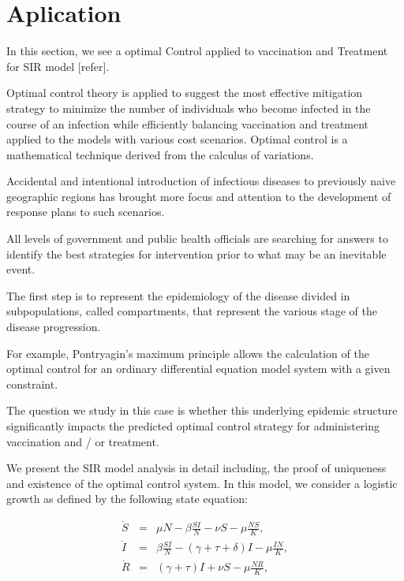 \section{Aplication}

In this section, we see a optimal Control applied to vaccination and Treatment for SIR model [refer].

Optimal control theory is applied to suggest the most effective mitigation strategy to minimize the number of individuals who become infected in the course of an infection while efficiently balancing vaccination and treatment applied to the models with various cost scenarios. Optimal control is a  mathematical technique derived from the calculus of variations.

Accidental and intentional introduction of infectious diseases  to previously naive geographic regions has brought more focus and attention to the development of response plans to such scenarios.

All levels of government and public health officials are searching for answers to identify the best strategies for intervention prior to what may be an inevitable event.

The first step is to represent the epidemiology of the disease divided in subpopulations, called compartments, that represent the various stage of the disease progression.

For example, Pontryagin’s maximum principle allows the calculation of the optimal control for an ordinary differential equation model system with a given constraint.

The question  we study in this case is whether this underlying epidemic structure significantly impacts the predicted optimal control strategy for administering vaccination and / or treatment.

We present the SIR model analysis in detail including, the proof of uniqueness and existence of the optimal control system. In this model, we consider a logistic growth as defined by the following state equation:

\begin{eqnarray}\label{eq.1.4.SIR}
\dot{S}  &=& \mu N-\beta\frac{SI}{N}-\nu S -\mu \frac{NS}{K}, \label{eq.1.4.1}  \\
\dot{I}   &=& \beta\frac{SI}{N} - (\gamma+\tau+\delta) I -\mu \frac{IN}{K}, \label{eq.1.4.2} \\
\dot{R} &=& (\gamma+\tau) I+\nu S - \mu \frac{NR}{K},  \label{eq.1.4.3}
\end{eqnarray}

